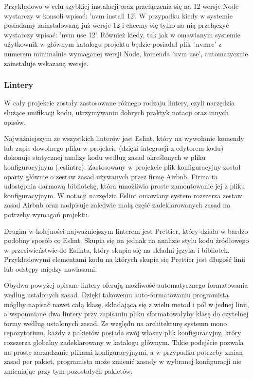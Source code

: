 Przykładowo w celu szybkiej instalacji oraz przełączenia się na 12 wersje Node wystarczy w konsoli wpisać: 'nvm install 12'. W przypadku kiedy w systemie posiadamy zainstalowaną już wersje 12 i chcemy się tylko na nią przełączyć wystarczy wpisać: 'nvm use 12'. Również kiedy, tak jak w omawianym systemie użytkownik w głównym katalogu projektu będzie posiadał plik '.nvmrc' z numerem minimalnie wymaganej wersji Node, komenda 'nvm use', automatycznie zainstaluje wskazaną wersje.


\subsubsection{Lintery}
W cały projekcie zostały zastosowane różnego rodzaju lintery, czyli narzędzia służące unifikacji kodu, utrzymywaniu dobrych praktyk notacji oraz innych opisów.

Najważniejszym ze wszystkich linterów jest Eslint, który na wywołanie komendy lub zapis dowolnego pliku w projekcie (dzięki integracji z edytorem kodu) dokonuje statycznej analizy kodu według zasad określonych w pliku konfiguracyjnym (.eslintrc). Zastosowany w projekcie plik konfiguracyjny został oparty głównie o zestaw zasad używanych przez firmę Airbnb. Firma ta udostępnia darmową bibliotekę, która umożliwia proste zamontowanie jej z pliku konfiguracyjnym. W notacji narzędzia Eslint omawiany system rozszerza zestaw zasad Airbnb oraz nadpisuje zaledwie małą część zadeklarowanych zasad na potrzeby wymagań projektu.

Drugim w kolejności najważniejszym linterem jest Prettier, który działa w bardzo podobny sposób co Eslint. Skupia się on jednak na analizie stylu kodu źródłowego w przeciwieństwie do Eslinta, który skupia się na składni języka i bibliotek. Przykładowymi elementami kodu na których skupia się Prettier jest długość linii lub odstępy między nawiasami.

Obydwa powyżej opisane lintery oferują możliwość automatycznego formatowania według ustalonych zasad. Dzięki takowemu auto-formatowaniu programista mógłby napisać nawet całą klasę, składającą się z wielu metod i pól w jednej linii, a wspomniane dwa lintery przy zapisaniu pliku sformatowałyby klasę do czytelnej formy według ustalonych zasad. Ze względu na architekturę systemu mono repozytorium, każdy z pakietów posiada swój własny plik konfiguracyjny, który rozszerza globalny zadeklarowany w katalogu głównym. Takie podejście pozwala na proste zarządzanie plikami konfiguracyjnymi, a w przypadku potrzeby zmian zasad per pakiet, programista może zmienić zasady w wybranej konfiguracji nie zmieniając przy tym pozostałych pakietów.

